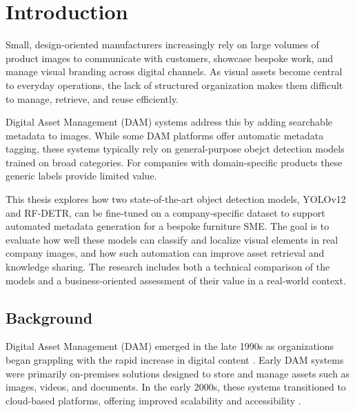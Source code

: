 \documentclass[a4paper,10pt,twocolumn]{article}
\numberwithin{figure}{section}
\numberwithin{table}{section}
\begin{document}

\twocolumn
\flushbottom %


\sloppy        %



\section{Introduction}

Small, design-oriented manufacturers increasingly rely on 
large volumes of product images to communicate with 
customers, showcase bespoke work, and manage visual 
branding across digital channels. As visual assets 
become central to everyday operations, the lack of structured 
organization makes them difficult to manage, retrieve, 
and reuse efficiently.

Digital Asset Management (DAM) systems address 
this by adding searchable metadata to images.
While some DAM platforms offer automatic metadata tagging, 
these systems typically rely on general-purpose obejct detection
models trained on broad categories. For companies with 
domain-specific products these generic labels provide
limited value.

This thesis explores how two state-of-the-art object 
detection models, YOLOv12 and RF-DETR, can be fine-tuned on 
a company-specific dataset to support automated metadata 
generation for a bespoke furniture SME. The goal is to 
evaluate how well these models can classify 
and localize visual elements in real company images, and 
how such automation can improve asset retrieval and 
knowledge sharing. The research includes both a technical 
comparison of the models and a business-oriented assessment 
of their value in a real-world context.


\subsection{Background}
Digital Asset Management (DAM) emerged in the late 1990s as organizations began grappling 
with the rapid increase in digital content \citep{krogh2009}. Early DAM systems were primarily on-premises 
solutions designed to store and manage assets such as images, videos, and documents. 
In the early 2000s, these systems transitioned to cloud-based platforms, offering 
improved scalability and accessibility \citep{mccain2021}.
\end{document}
